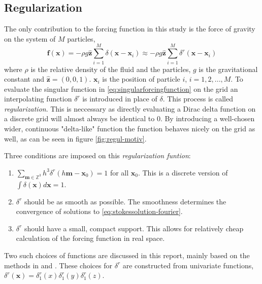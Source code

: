 \documentclass[a4paper,
twoside=false,abstract=false,numbers=noenddot,
titlepage=false,headings=small,parskip=half,version=last]{scrartcl}
\begin{document}
\subsection{Regularization\label{section:regularization}}
The only contribution to the forcing function in this study is the force of gravity on the system of $M$ particles,
\begin{equation}
\mathbf{f}(\mathbf{x}) = -\rho g\hat{\mathbf{z}}\sum_{i=1}^M \delta (\mathbf{x}-\mathbf{x}_i)\label{eq:singularforcingfunction}
\approx -\rho g\hat{\mathbf{z}}\sum_{i=1}^M \delta^{r} (\mathbf{x}-\mathbf{x}_i)
\end{equation}
where $\rho$ is the relative density of the fluid and the particles, $g$ is the gravitational constant and $\hat{\mathbf{z}}=(0,0,1)$. $\mathbf{x}_i$ is the position of particle $i$, $i=1,2,...,M$.
To evaluate the singular function in \eqref{eq:singularforcingfunction} on the grid an interpolating function $\delta^{r}$ is introduced in place of $\delta$.
This process is called \emph{regularization}.
This is neccessary as directly evaluating a Dirac delta function on a discrete grid will almost always be identical to $0$.
By introducing a well-chosen wider, continuous "delta-like" function the function behaves nicely on the grid as well, as can be seen in figure \ref{fig:regul-motiv}.

Three conditions are imposed on this \emph{regularization funtion}:
\begin{enumerate}
\item $\sum_{\mathbf{m}\in \mathbb{Z}^3}h^3\delta^{r}(h\mathbf{m}-\mathbf{x}_0) = 1$ for all $\mathbf{x}_0$. This is a discrete version of $\int \delta(\mathbf{x}) d\mathbf{x}=1$.
\item $\delta^{r}$ should be as smooth as possible. The smoothness determines the convergence of solutions to \eqref{eq:stokessolution-fourier}.
\item $\delta^{r}$ should have a small, compact support. This allows for relatively cheap calculation of the forcing function in real space.
\end{enumerate}
Two such choices of functions are discussed in this report, mainly based on the methods in \cite{spectralewald} and \cite{interfaceregularization}.
These choices for $\delta^{r}$ are constructed from univariate functions, $\delta^{r}(\mathbf{x}) = \delta^{r}_{1}(x) \delta^{r}_{1}(y) \delta^{r}_{1}(z)$.
\end{document}
